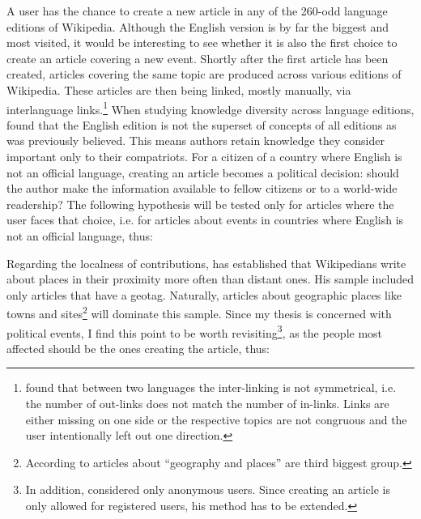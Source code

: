 

A user has the chance to create a new article in any of the 260-odd language editions of Wikipedia.
Although the English version is by far the biggest and most visited, it would be interesting to see whether it is also the first choice to create an article covering a new event.
Shortly after the first article has been created, articles covering the same topic are produced across various editions of Wikipedia.
These articles are then being linked, mostly manually, via interlanguage links.\footnote{\textcite{adar2009information} found that between two languages the inter-linking is not symmetrical, i.e. the number of out-links does not match the number of in-links. Links are either missing on one side or the respective topics are not congruous and the user intentionally left out one direction.}
When studying knowledge diversity across language editions, \textcite{hecht2010tower} found that the English edition is not the superset of concepts of all editions as was previously believed.
This means authors retain knowledge they consider important only to their compatriots.
For a citizen of a country where English is not an official language, creating an article becomes a political decision: should the author make the information available to fellow citizens or to a world-wide readership?
The following hypothesis will be tested only for articles where the user faces that choice, i.e. for articles about events in countries where English is not an official language, thus:


Regarding the localness of contributions, \textcite[57]{hardy2011volunteered} has established that Wikipedians write about places in their proximity more often than distant ones.
His sample included only articles that have a geotag.
Naturally, articles about geographic places like towns and sites\footnote{According to \textcite{kittur2009s} articles about ``geography and places'' are third biggest group.} will dominate this sample.
Since my thesis is concerned with political events, I find this point to be worth revisiting\footnote{In addition, \textcite[61]{hardy2011volunteered} considered only anonymous users. Since creating an article is only allowed for registered users, his method has to be extended.}, as the people most affected should be the ones creating the article, thus:

